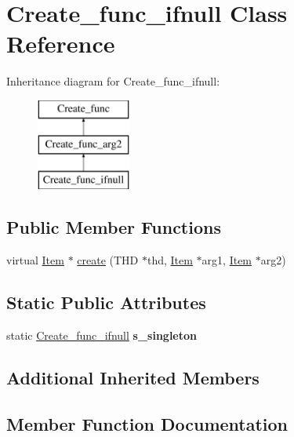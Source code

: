 \hypertarget{classCreate__func__ifnull}{}\section{Create\+\_\+func\+\_\+ifnull Class Reference}
\label{classCreate__func__ifnull}
Inheritance diagram for Create\+\_\+func\+\_\+ifnull\+:\begin{figure}[H]
\begin{center}
\leavevmode
\includegraphics[height=3.000000cm]{classCreate__func__ifnull}
\end{center}
\end{figure}
\subsection*{Public Member Functions}
\begin{DoxyCompactItemize}
\item 
virtual \mbox{\hyperlink{classItem}{Item}} $\ast$ \mbox{\hyperlink{classCreate__func__ifnull_aba4e96bab3df1a9529ec5cc0aec99f7e}{create}} (T\+HD $\ast$thd, \mbox{\hyperlink{classItem}{Item}} $\ast$arg1, \mbox{\hyperlink{classItem}{Item}} $\ast$arg2)
\end{DoxyCompactItemize}
\subsection*{Static Public Attributes}
\begin{DoxyCompactItemize}
\item 
\mbox{\label{classCreate__func__ifnull_a9d6f8bdc6ce9692bc111cd6bc2de81e8}} 
static \mbox{\hyperlink{classCreate__func__ifnull}{Create\+\_\+func\+\_\+ifnull}} {\bfseries s\+\_\+singleton}
\end{DoxyCompactItemize}
\subsection*{Additional Inherited Members}


\subsection{Member Function Documentation}
\mbox{\label{classCreate__func__ifnull_aba4e96bab3df1a9529ec5cc0aec99f7e}} 

